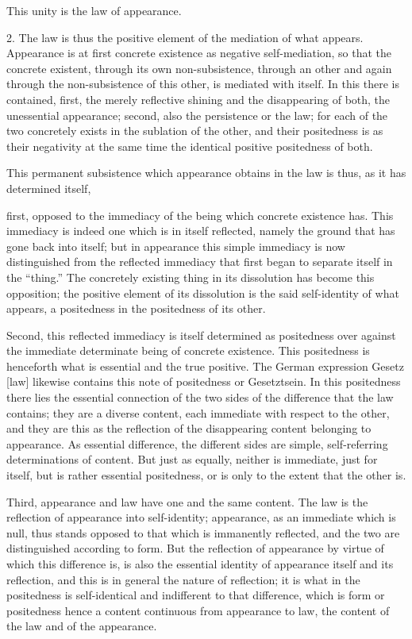 This unity is the law of appearance.

2. The law is thus the positive element of the mediation of what appears.
Appearance is at first concrete existence as negative self-mediation,
so that the concrete existent, through its own non-subsistence,
through an other and again through the non-subsistence of this other,
is mediated with itself.
In this there is contained, 
first, the merely reflective shining
and the disappearing of both,
the unessential appearance;
second, also the persistence or the law;
for each of the two concretely exists in the sublation of the other,
and their positedness is as their negativity at the same time
the identical positive positedness of both.

This permanent subsistence which appearance obtains in the law is thus,
as it has determined itself,

first, opposed to the immediacy
of the being which concrete existence has.
This immediacy is indeed one which is in itself reflected,
namely the ground that has gone back into itself;
but in appearance this simple immediacy is now distinguished
from the reflected immediacy that first began
to separate itself in the “thing.”
The concretely existing thing in its dissolution
has become this opposition;
the positive element of its dissolution is
the said self-identity of what appears,
a positedness in the positedness of its other.

Second, this reflected immediacy is itself determined
as positedness over against the immediate determinate being
of concrete existence.
This positedness is henceforth what is essential
and the true positive.
The German expression Gesetz [law] likewise contains this
note of positedness or Gesetztsein.
In this positedness there lies the essential connection of
the two sides of the difference that the law contains;
they are a diverse content, each immediate with respect to the other,
and they are this as the reflection of the disappearing content
belonging to appearance.
As essential difference, the different sides are
simple, self-referring determinations of content.
But just as equally, neither is immediate,
just for itself, but is rather essential positedness,
or is only to the extent that the other is.

Third, appearance and law have one and the same content.
The law is the reflection of appearance into self-identity;
appearance, as an immediate which is null,
thus stands opposed to that which is immanently reflected,
and the two are distinguished according to form.
But the reflection of appearance by virtue of which this difference is,
is also the essential identity of appearance itself and its reflection,
and this is in general the nature of reflection;
it is what in the positedness is self-identical
and indifferent to that difference,
which is form or positedness hence a content continuous
from appearance to law, the content of the law and of the appearance.

